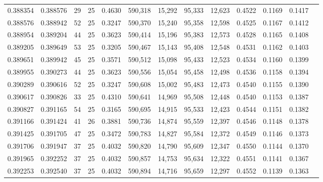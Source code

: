 \begin{tabular}{rrrrrrrrrrrrr}
0.388354 & 0.388576 &    29 &  25 &                                     0.4630 & 590,318 &  15,292 &  95,333 &  12,623 & 0.4522 & 0.1169 & 0.1417 \\
0.388576 & 0.388942 &    52 &  25 &                                     0.3247 & 590,370 &  15,240 &  95,358 &  12,598 & 0.4525 & 0.1167 & 0.1412 \\
0.388954 & 0.389204 &    44 &  25 &                                     0.3623 & 590,414 &  15,196 &  95,383 &  12,573 & 0.4528 & 0.1165 & 0.1408 \\
0.389205 & 0.389649 &    53 &  25 &                                     0.3205 & 590,467 &  15,143 &  95,408 &  12,548 & 0.4531 & 0.1162 & 0.1403 \\
0.389651 & 0.389942 &    45 &  25 &                                     0.3571 & 590,512 &  15,098 &  95,433 &  12,523 & 0.4534 & 0.1160 & 0.1399 \\
0.389955 & 0.390273 &    44 &  25 &                                     0.3623 & 590,556 &  15,054 &  95,458 &  12,498 & 0.4536 & 0.1158 & 0.1394 \\
0.390289 & 0.390616 &    52 &  25 &                                     0.3247 & 590,608 &  15,002 &  95,483 &  12,473 & 0.4540 & 0.1155 & 0.1390 \\
0.390617 & 0.390826 &    33 &  25 &                                     0.4310 & 590,641 &  14,969 &  95,508 &  12,448 & 0.4540 & 0.1153 & 0.1387 \\
0.390827 & 0.391165 &    54 &  25 &                                     0.3165 & 590,695 &  14,915 &  95,533 &  12,423 & 0.4544 & 0.1151 & 0.1382 \\
0.391166 & 0.391424 &    41 &  26 &                                     0.3881 & 590,736 &  14,874 &  95,559 &  12,397 & 0.4546 & 0.1148 & 0.1378 \\
0.391425 & 0.391705 &    47 &  25 &                                     0.3472 & 590,783 &  14,827 &  95,584 &  12,372 & 0.4549 & 0.1146 & 0.1373 \\
0.391706 & 0.391947 &    37 &  25 &                                     0.4032 & 590,820 &  14,790 &  95,609 &  12,347 & 0.4550 & 0.1144 & 0.1370 \\
0.391965 & 0.392252 &    37 &  25 &                                     0.4032 & 590,857 &  14,753 &  95,634 &  12,322 & 0.4551 & 0.1141 & 0.1367 \\
0.392253 & 0.392540 &    37 &  25 &                                     0.4032 & 590,894 &  14,716 &  95,659 &  12,297 & 0.4552 & 0.1139 & 0.1363 \\

\end{tabular}
